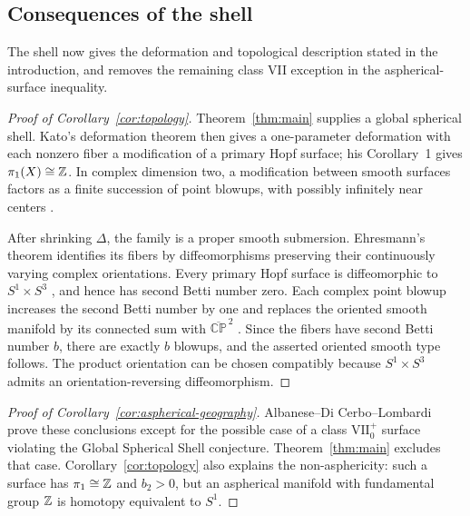 \subsection{Consequences of the shell}\label{sec:consequences}

The shell now gives the deformation and topological description stated
in the introduction, and removes the remaining class VII exception in
the aspherical-surface inequality.

\begin{proof}[Proof of Corollary~\ref{cor:topology}]
Theorem~\ref{thm:main} supplies a global spherical shell. Kato's
deformation theorem \cite[Theorem~1]{Kato1977} then gives a
one-parameter deformation with each nonzero fiber a modification of a
primary Hopf surface; his Corollary~1 gives $\pi_1(X)\cong\mathbb Z$.
In complex dimension two, a modification between smooth surfaces factors
as a finite succession of point blowups, with possibly infinitely near
centers \cite{BHPV2004}.

After shrinking $\Delta$, the family is a proper smooth submersion.
Ehresmann's theorem identifies its fibers by diffeomorphisms preserving
their continuously varying complex orientations. Every primary Hopf
surface is diffeomorphic to $S^1\times S^3$
\cite[\S1, p.~1109]{GauduchonOrnea1998}, and hence has second Betti number
zero. Each complex point blowup increases the second Betti number by one
and replaces the oriented smooth manifold by its connected sum with
$\overline{\mathbb{CP}}^{\,2}$ \cite{BHPV2004}. Since the fibers have
second Betti number $b$, there are exactly $b$ blowups, and the asserted
oriented smooth type follows. The product orientation can be chosen
compatibly because $S^1\times S^3$ admits an orientation-reversing
diffeomorphism.
\end{proof}

\begin{proof}[Proof of Corollary~\ref{cor:aspherical-geography}]
Albanese--Di Cerbo--Lombardi~\cite[Theorem~1.4]{AlbaneseDiCerboLombardi2025}
prove these conclusions except for the possible case of a class
$\mathrm{VII}_0^+$ surface violating the Global Spherical Shell conjecture.
Theorem~\ref{thm:main} excludes that case. Corollary~\ref{cor:topology}
also explains the non-asphericity: such a surface has $\pi_1\cong\mathbb Z$
and $b_2>0$, but an aspherical manifold with fundamental group $\mathbb Z$
is homotopy equivalent to $S^1$.
\end{proof}
